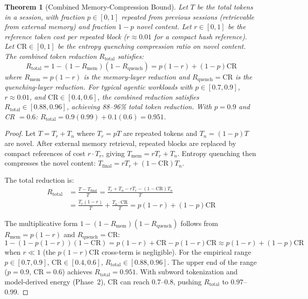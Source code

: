 \documentclass[10pt,a4paper]{amsart}
\newtheorem{theorem}{Theorem}
\begin{document}
\begin{theorem}[Combined Memory-Compression Bound]
\label{thm:combined-bound}
Let $T$ be the total tokens in a session, with fraction $p \in [0,1]$ repeated
from previous sessions (retrievable from external memory) and fraction
$1-p$ novel content. Let $r \in [0,1]$ be the reference token cost per
repeated block ($r \approx 0.01$ for a compact hash reference). Let
$\text{CR} \in [0,1]$ be the entropy quenching compression ratio on novel
content. The combined token reduction $R_{\text{total}}$ satisfies:
\begin{equation}
    R_{\text{total}} = 1 - (1 - R_{\text{mem}})(1 - R_{\text{quench}})
    = p(1-r) + (1-p)\text{CR}
\end{equation}
where $R_{\text{mem}} = p(1-r)$ is the memory-layer reduction and
$R_{\text{quench}} = \text{CR}$ is the quenching-layer reduction.
For typical agentic workloads with $p \in [0.7, 0.9]$, $r \approx 0.01$,
and $\text{CR} \in [0.4, 0.6]$, the combined reduction satisfies
$R_{\text{total}} \in [0.88, 0.96]$, achieving 88--96\% total token
reduction. With $p = 0.9$ and CR $= 0.6$: $R_{\text{total}} = 0.9(0.99)
+ 0.1(0.6) = 0.951$.
\end{theorem}

\begin{proof}
Let $T = T_r + T_n$ where $T_r = pT$ are repeated tokens and $T_n = (1-p)T$
are novel. After external memory retrieval, repeated blocks are replaced by
compact references of cost $r \cdot T_r$, giving $T_{\text{mem}} = rT_r + T_n$.
Entropy quenching then compresses the novel content: $T_{\text{final}} =
rT_r + (1-\text{CR})T_n$.

The total reduction is:
\begin{align}
    R_{\text{total}} &= \frac{T - T_{\text{final}}}{T}
    = \frac{T_r + T_n - rT_r - (1-\text{CR})T_n}{T} \\
    &= \frac{T_r(1-r)}{T} + \frac{T_n \cdot \text{CR}}{T}
    = p(1-r) + (1-p)\text{CR}
\end{align}

The multiplicative form $1 - (1-R_{\text{mem}})(1-R_{\text{quench}})$ follows
from $R_{\text{mem}} = p(1-r)$ and $R_{\text{quench}} = \text{CR}$:
\begin{equation}
    1 - (1-p(1-r))(1-\text{CR}) = p(1-r) + \text{CR} - p(1-r)\text{CR}
    \approx p(1-r) + (1-p)\text{CR}
\end{equation}
when $r \ll 1$ (the $p(1-r)\text{CR}$ cross-term is negligible). For the
empirical range $p \in [0.7, 0.9]$, $\text{CR} \in [0.4, 0.6]$,
$R_{\text{total}} \in [0.88, 0.96]$. The upper end of the range
($p = 0.9$, $\text{CR} = 0.6$) achieves $R_{\text{total}} = 0.951$.
With subword tokenization and model-derived energy (Phase~2), CR can reach
0.7--0.8, pushing $R_{\text{total}}$ to $0.97$--$0.99$.
\end{proof}
\end{document}
